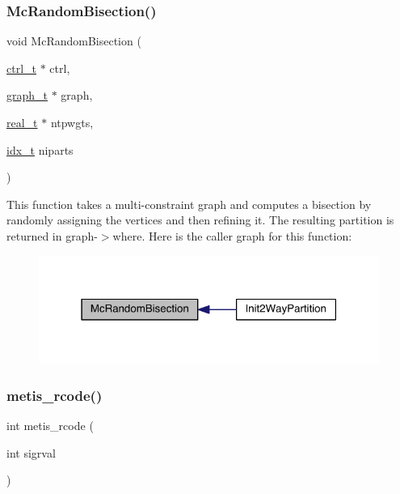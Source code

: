 \subsubsection{\texorpdfstring{Mc\+Random\+Bisection()}{McRandomBisection()}}
{\footnotesize\ttfamily void Mc\+Random\+Bisection (\begin{DoxyParamCaption}\item[{\hyperlink{a00742}{ctrl\+\_\+t} $\ast$}]{ctrl,  }\item[{\hyperlink{a00734}{graph\+\_\+t} $\ast$}]{graph,  }\item[{\hyperlink{a00876_a1924a4f6907cc3833213aba1f07fcbe9}{real\+\_\+t} $\ast$}]{ntpwgts,  }\item[{\hyperlink{a00876_aaa5262be3e700770163401acb0150f52}{idx\+\_\+t}}]{niparts }\end{DoxyParamCaption})}

This function takes a multi-\/constraint graph and computes a bisection by randomly assigning the vertices and then refining it. The resulting partition is returned in graph-\/$>$where. Here is the caller graph for this function\+:\nopagebreak
\begin{figure}[H]
\begin{center}
\leavevmode
\includegraphics[width=316pt]{a00945_a3ac013a2933e687d40aee2496120367e_icgraph}
\end{center}
\end{figure}
\mbox{\label{a00945_ac721aa5656ee0877443c01d6fa19f72c}} 
\subsubsection{\texorpdfstring{metis\+\_\+rcode()}{metis\_rcode()}}
{\footnotesize\ttfamily int metis\+\_\+rcode (\begin{DoxyParamCaption}\item[{int}]{sigrval }\end{DoxyParamCaption})}

